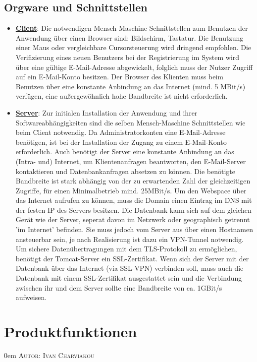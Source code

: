 \documentclass{article}
\makeatletter
\newcommand{\sectionauthor}[1]{
	{\parindent 0em \large \scshape Autor: #1 \par \nobreak \vspace*{2em}}
	\@afterheading
}
\makeatother
\begin{document}
\subsection{Orgware und Schnittstellen}
\begin{itemize}
\item \underline{\textbf{Client}}: \linebreak
Die notwendigen Mensch-Maschine Schnittstellen zum Benutzen der Anwendung über einen Browser sind: Bildschirm, Tastatur. Die Benutzung einer Maus oder vergleichbare Cursorsteuerung wird dringend empfohlen. Die Verifizierung eines neuen Benutzers bei der Registrierung im System wird über eine gültige E-Mail-Adresse abgewickelt, folglich muss der Nutzer Zugriff auf ein E-Mail-Konto besitzen. Der Browser des Klienten muss beim Benutzen über eine konstante Anbindung an das Internet (mind. 5 MBit/s) verfügen, eine außergewöhnlich hohe Bandbreite ist nicht erforderlich.
\item \underline{\textbf{Server}}: \linebreak
Zur initialen Installation der Anwendung und ihrer Softwareabhängigkeiten sind die selben Mensch-Maschine Schnittstellen wie beim Client notwendig. Da Administratorkonten eine E-Mail-Adresse benötigen, ist bei der Installation der Zugang zu einem E-Mail-Konto erforderlich. Auch benötigt der Server eine konstante Anbindung an das (Intra- und) Internet, um Klientenanfragen beantworten, den E-Mail-Server kontaktieren und Datenbankanfragen absetzen zu können. Die benötigte Bandbreite ist stark abhängig von der zu erwartenden Zahl der gleichzeitigen Zugriffe, für einen Minimalbetrieb mind. 25MBit/s. Um den Webspace über das Internet aufrufen zu können, muss die Domain einen Eintrag im DNS mit der festen IP des Servers besitzen. Die Datenbank kann sich auf dem gleichen Gerät wie der Server, seperat davon im Netzwerk oder geographisch getrennt 'im Internet'  befinden. Sie muss jedoch vom Server aus über einen Hostnamen ansteuerbar sein, je nach Realisierung ist dazu ein VPN-Tunnel notwendig. Um sichere Datenübertragungen mit dem TLS-Protokoll zu ermöglichen, benötigt der Tomcat-Server ein SSL-Zertifikat. Wenn sich der Server mit der Datenbank über das Internet (via SSL-VPN) verbinden soll, muss auch die Datenbank mit einem SSL-Zertifikat ausgestattet sein und die Verbindung zwischen ihr und dem Server sollte eine Bandbreite von ca. 1GBit/s aufweisen.
\end{itemize}

\section{Produktfunktionen} %
\sectionauthor{Ivan Charviakou}
\end{document}
